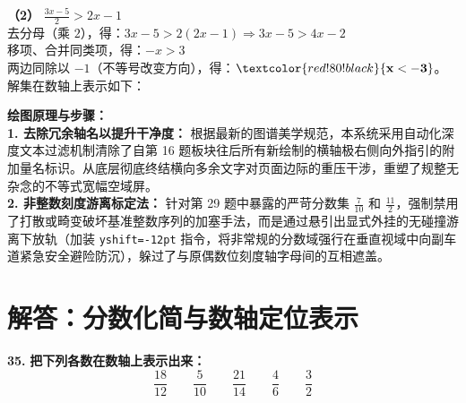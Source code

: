 \vspace{0.4cm}
\textbf{（2）} $\frac{3x-5}{2} > 2x - 1$ \\
去分母（乘 $2$），得：$3x - 5 > 2(2x - 1) \Rightarrow 3x - 5 > 4x - 2$ \\
移项、合并同类项，得：$-x > 3$ \\
两边同除以 $-1$（不等号改变方向），得：$\textcolor{red!80!black}{\mathbf{x < -3}}$。\\
解集在数轴上表示如下：
\begin{center}
\end{center}

\vspace{0.4cm}
{\small\color{blue!70!black}
\textbf{绘图原理与步骤：}\\
\textbf{1. 去除冗余轴名以提升干净度：} 根据最新的图谱美学规范，本系统采用自动化深度文本过滤机制清除了自第 16 题板块往后所有新绘制的横轴极右侧向外指引的附加量名标识。从底层彻底终结横向多余文字对页面边际的重压干涉，重塑了规整无杂念的不等式宽幅空域屏。\\
\textbf{2. 非整数刻度游离标定法：} 针对第 29 题中暴露的严苛分数集 $\frac{7}{10}$ 和 $\frac{11}{2}$，强制禁用了打散或畸变破坏基准整数序列的加塞手法，而是通过悬引出显式外挂的无碰撞游离下放轨（加装 \texttt{yshift=-12pt} 指令，将非常规的分数域强行在垂直视域中向副车道紧急安全避险防沉），躲过了与原偶数位刻度轴字母间的互相遮盖。
}

\newpage



\section{解答：分数化简与数轴定位表示}

\vspace{0.6cm}

\textbf{\LARGE 35.} \textbf{把下列各数在数轴上表示出来：}
\[
\frac{18}{12} \qquad \frac{5}{10} \qquad \frac{21}{14} \qquad \frac{4}{6} \qquad \frac{3}{2}
\]


